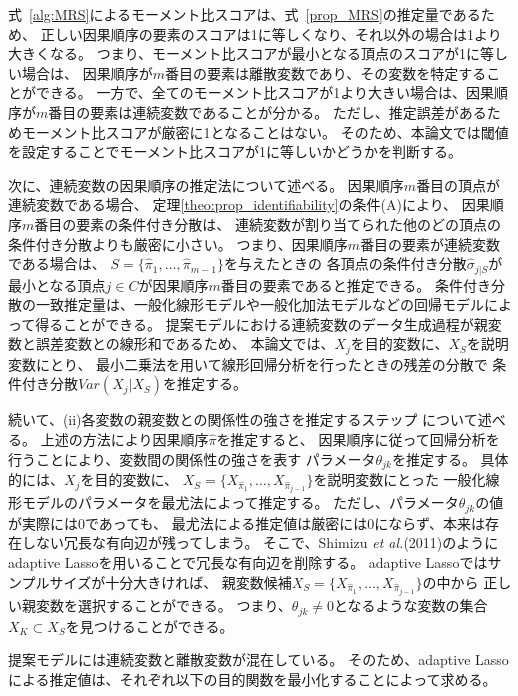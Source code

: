 式~\eqref{alg:MRS}によるモーメント比スコアは、式~\eqref{prop_MRS}の推定量であるため、
正しい因果順序の要素のスコアは1に等しくなり、それ以外の場合は1より大きくなる。
つまり、モーメント比スコアが最小となる頂点のスコアが1に等しい場合は、
因果順序が$m$番目の要素は離散変数であり、その変数を特定することができる。
一方で、全てのモーメント比スコアが1より大きい場合は、因果順序が$m$番目の要素は連続変数であることが分かる。
ただし、推定誤差があるためモーメント比スコアが厳密に1となることはない。
そのため、本論文では閾値を設定することでモーメント比スコアが1に等しいかどうかを判断する。

次に、連続変数の因果順序の推定法について述べる。
因果順序$m$番目の頂点が連続変数である場合、
定理\ref{theo:prop_identifiability}の条件(A)により、
因果順序$m$番目の要素の条件付き分散は、
連続変数が割り当てられた他のどの頂点の条件付き分散よりも厳密に小さい。
つまり、因果順序$m$番目の要素が連続変数である場合は、
$S =\{\widehat{\pi}_1, \dots, \widehat{\pi}_{m-1}\}$を与えたときの
各頂点の条件付き分散$\widehat{\sigma}_{j|S}$が
最小となる頂点$j \in C$が因果順序$m$番目の要素であると推定できる。
条件付き分散の一致推定量は、一般化線形モデルや一般化加法モデルなどの回帰モデルによって得ることができる。
提案モデルにおける連続変数のデータ生成過程が親変数と誤差変数との線形和であるため、
本論文では、$X_j$を目的変数に、$X_S$を説明変数にとり、
最小二乗法を用いて線形回帰分析を行ったときの残差の分散で
条件付き分散$\mathit{Var}(X_j|X_S)$を推定する。

続いて、(ii)各変数の親変数との関係性の強さを推定するステップ について述べる。
上述の方法により因果順序$\widehat{\pi}$を推定すると、
因果順序に従って回帰分析を行うことにより、変数間の関係性の強さを表す
パラメータ$\theta_{jk}$を推定する。
具体的には、$X_j$を目的変数に、
$X_S = \{ X_{\widehat{\pi}_1}, \dots, X_{\widehat{\pi}_{j-1}}\}$を説明変数にとった
一般化線形モデルのパラメータを最尤法によって推定する。
ただし、パラメータ$\theta_{jk}$の値が実際には0であっても、
最尤法による推定値は厳密には0にならず、本来は存在しない冗長な有向辺が残ってしまう。
そこで、Shimizu \textit{et al.}(2011)\cite{Shimizu2011-pd}のように
adaptive Lasso\cite{Zou2006-pi}を用いることで冗長な有向辺を削除する。
adaptive Lassoではサンプルサイズが十分大きければ、
親変数候補$X_S = \{ X_{\widehat{\pi}_1}, \dots, X_{\widehat{\pi}_{j-1}}\}$の中から
正しい親変数を選択することができる。
つまり、$\theta_{jk} \neq 0$となるような変数の集合$X_K \subset X_S$を見つけることができる。

提案モデルには連続変数と離散変数が混在している。
そのため、adaptive Lassoによる推定値は、それぞれ以下の目的関数を最小化することによって求める。

